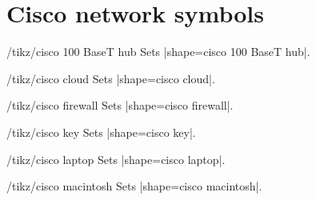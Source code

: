 \documentclass[a4paper]{ltxdoc}
\begin{document}
\section{Cisco network symbols}
\label{sec:cisco-network-symbols}

\begin{stylekey}{/tikz/cisco 100 BaseT hub}
Sets |shape={cisco 100 BaseT hub}|.
\begin{codeexample}[preamble={\usetikzlibrary{shapes.cisco.100basethub}}]
\end{codeexample}
\end{stylekey}

\begin{stylekey}{/tikz/cisco cloud}
Sets |shape={cisco cloud}|.
\begin{codeexample}[preamble={\usetikzlibrary{shapes.cisco.cloud}}]
\end{codeexample}
\end{stylekey}

\begin{stylekey}{/tikz/cisco firewall}
Sets |shape={cisco firewall}|.
\begin{codeexample}[preamble={\usetikzlibrary{shapes.cisco.firewall}}]
\end{codeexample}
\end{stylekey}

\begin{stylekey}{/tikz/cisco key}
Sets |shape={cisco key}|.
\begin{codeexample}[preamble={\usetikzlibrary{shapes.cisco.key}}]
\end{codeexample}
\end{stylekey}

\begin{stylekey}{/tikz/cisco laptop}
Sets |shape={cisco laptop}|.
\begin{codeexample}[preamble={\usetikzlibrary{shapes.cisco.laptop}}]
\end{codeexample}
\end{stylekey}

\begin{stylekey}{/tikz/cisco macintosh}
Sets |shape={cisco macintosh}|.
\begin{codeexample}[preamble={\usetikzlibrary{shapes.cisco.macintosh}}]
\end{codeexample}
\end{stylekey}
\end{document}
